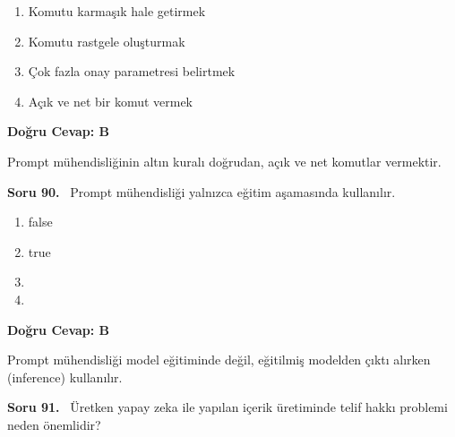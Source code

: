 \documentclass[11pt,a4paper,openany]{book}
\begin{document}
\begin{enumerate}[label=\Alph*), leftmargin=25pt, topsep=4pt, itemsep=2pt]
        \item Komutu karmaşık hale getirmek
        \item Komutu rastgele oluşturmak
        \item Çok fazla onay parametresi belirtmek
        \item Açık ve net bir komut vermek
\end{enumerate}

\vspace{4pt}
\begin{tcolorbox}[title=Cevap ve Açıklama, colback=gray!3!white, colframe=primarycolor!90!black, arc=2mm, fonttitle=\bfseries\sffamily, top=6pt, bottom=6pt]
    \textbf{Doğru Cevap: B}

    \vspace{2pt}
    Prompt mühendisliğinin altın kuralı doğrudan, açık ve net komutlar vermektir.
\end{tcolorbox}
\vspace{10pt}
\needspace{5cm}
\vspace{8pt}
\noindent\textbf{\large\sffamily Soru 90.} \ Prompt mühendisliği yalnızca eğitim aşamasında kullanılır.

\begin{enumerate}[label=\Alph*), leftmargin=25pt, topsep=4pt, itemsep=2pt]
        \item false
        \item true
        \item 
        \item 
\end{enumerate}

\vspace{4pt}
\begin{tcolorbox}[title=Cevap ve Açıklama, colback=gray!3!white, colframe=primarycolor!90!black, arc=2mm, fonttitle=\bfseries\sffamily, top=6pt, bottom=6pt]
    \textbf{Doğru Cevap: B}

    \vspace{2pt}
    Prompt mühendisliği model eğitiminde değil, eğitilmiş modelden çıktı alırken (inference) kullanılır.
\end{tcolorbox}
\vspace{10pt}
\needspace{5cm}
\vspace{8pt}
\noindent\textbf{\large\sffamily Soru 91.} \ Üretken yapay zeka ile yapılan içerik üretiminde telif hakkı problemi neden önemlidir?
\end{document}
